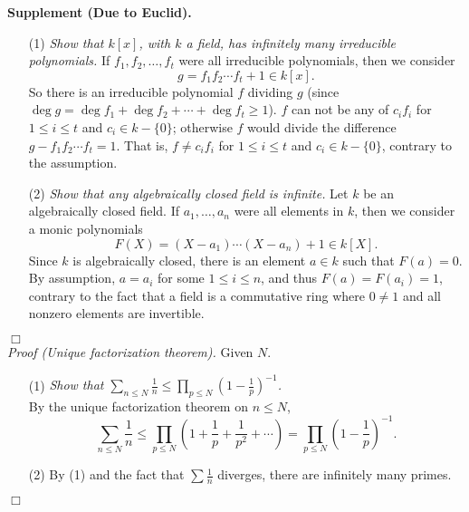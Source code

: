 \documentclass{article}
\begin{document}
\textbf{Supplement (Due to Euclid).}
\begin{enumerate}
\item[(1)]
  \emph{Show that $k[x]$, with $k$ a field,
  has infinitely many irreducible polynomials.}
  If
  $f_1, f_2, \ldots, f_t$ were all irreducible polynomials, then
  we consider $$g = f_1 f_2 \cdots f_t + 1 \in k[x].$$
  So there is an irreducible polynomial $f$ dividing $g$
  (since $\deg g = \deg f_1 + \deg f_2 + \cdots + \deg f_t \geq 1$).
  $f$ can not be any of $c_i f_i$ for $1 \leq i \leq t$ and $c_i \in k - \{0\}$;
  otherwise $f$ would divide the difference $g - f_1 f_2 \cdots f_t = 1$.
  That is, $f \neq c_i f_i$ for $1 \leq i \leq t$ and $c_i \in k - \{0\}$,
  contrary to the assumption.

\item[(2)]
  \emph{Show that any algebraically closed field is infinite.}
  Let $k$ be an algebraically closed field.
  If $a_1, \ldots, a_n$ were all elements in $k$, then
  we consider a monic polynomials
  \[
    F(X) = (X - a_1) \cdots (X - a_n) + 1 \in k[X].
  \]
  Since $k$ is algebraically closed,
  there is an element $a \in k$ such that $F(a) = 0$.
  By assumption, $a = a_i$ for some $1 \leq i \leq n$,
  and thus $F(a) = F(a_i) = 1$, contrary to the fact that
  a field is a commutative ring where $0 \neq 1$ and all nonzero elements are invertible.
\end{enumerate}
$\Box$ \\



\emph{Proof (Unique factorization theorem).}
Given $N$.
\begin{enumerate}
\item[(1)]
  \emph{Show that $\sum_{n \leq N} \frac{1}{n}
  \leq \prod_{p \leq N} \left( 1 - \frac{1}{p} \right)^{-1}$.} \\
  By the unique factorization theorem on $n \leq N$,
  \[
    \sum_{n \leq N} \frac{1}{n}
    \leq \prod_{p \leq N} \left( 1 + \frac{1}{p} + \frac{1}{p^2} + \cdots \right)
    = \prod_{p \leq N} \left( 1 - \frac{1}{p} \right)^{-1}.
  \]

\item[(2)]
  By (1) and the fact that $\sum \frac{1}{n}$ diverges,
  there are infinitely many primes.
\end{enumerate}
$\Box$ \\
\end{document}
